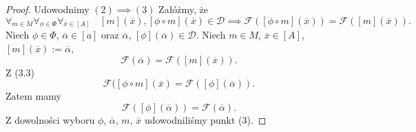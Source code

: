 \documentclass[12pt,a4paper]{report}
\newcommand{\domkniecie}[1]{\left[ {#1} \right] }
\begin{document}
\begin{proof}
Udowodnimy $(2) \implies (3)$
Załóżmy, że
\begin{equation}
\forall_{m \in M}\forall_{\phi \in \Phi} \forall_{\overline{x} \in \domkniecie{A}} \quad \domkniecie{m}(\overline{x}),\domkniecie{\phi\circ m}(\overline{x}) \in \mathcal{D} \implies \mathcal{F}( \domkniecie{\phi \circ m}(\overline{x}))=\mathcal{F}(\domkniecie{m}(\overline{x})).
\end{equation}
Niech $\phi \in \Phi$, $\overline{\alpha} \in \domkniecie{a}$ oraz $\overline{\alpha}$, $\domkniecie{\phi}(\overline{\alpha})\in \mathcal{D}$. Niech $m \in M$, $\overline{x} \in \domkniecie{A}$, $\domkniecie{m}(\overline{x}):= \overline{\alpha}$, 
$$
 \mathcal{F}(\overline{\alpha})=\mathcal{F}(\domkniecie{m}(\overline{x})).
$$
Z (3.3)
$$
\mathcal{F}(\domkniecie{\phi \circ m}(\overline{x})=\mathcal{F}(\domkniecie{\phi}(\overline{\alpha})).
$$
Zatem mamy
$$
\mathcal{F}(\domkniecie{\phi}(\overline{\alpha}))=\mathcal{F}(\overline{\alpha}).
$$
Z dowolności wyboru $\phi$, $\overline{\alpha}$, $m$, $\overline{x}$ udowodniliśmy punkt (3).
\end{proof}
\end{document}
